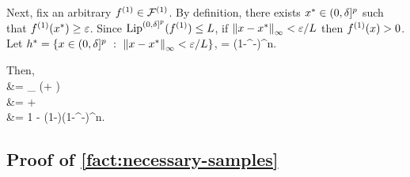Next, fix an arbitrary $f^{(1)}\in\mathcal{F}^{(1)}$. By definition, there exists $x^* \in (0,\delta]^p$ such that $f^{(1)}(x^*) \geq \varepsilon$. Since $\mathrm{Lip}^{(0,\delta]^p}(f^{(1)}) \leq L$, if $\norm{\covval-\covvalalt}_\infty < \outscale/\lipconst$ then $f^{(1)}(x) > 0$. Let $\cubealt = \{\covval\in(0,\inscale]^\covdim \setdelim \norm{\covval-\covvalalt}_\infty < \outscale/\lipconst\}$, 
\*[
    \sampcompevent\timeind{t} = \Big\{\covobs\timeind{t} \in \cubealt \Big\}, \quad\text{and}\quad
    \sampcompevent = \bigcup_{t\in[n]} \sampcompevent\timeind{t}.
\]
Further, let $\inoutratio = \lipconst \inscale / (2\outscale)$. 
By definition, since $\queryalgo\feat{\inscale}$ is independent of $\model\altind$,
\*[
    \PP\feat{\queryalgo\feat{\inscale}\timeind{1:n}}\Big[\comp{\sampcompevent} \Big]
    = (1-\inoutratio^{-\covdim})^n.
\]

Then,
\*[
    \sampsenssym\timeind{n}(\queryalgo\feat{\inscale}, \samphyptestoracle\feat{\covprob})
    &= \inf_{\model\in\modelspace\altind} \EE\Big[\samphyprv{\queryalgo\feat{\inscale}[\model]}{\samphyptestoracle\feat{\covprob}}{n}\Big] \\
    &= \inf_{\model\in\modelspace\altind}
    \Bigg(\EE{}\PP{}\Big[\sampcompevent\Big] + \EE{}\PP{}\Big[\comp{\sampcompevent}\Big] \Bigg) \\
    &= \PP{}\Big[\sampcompevent\Big] + \covprob \cdot \PP{}\Big[\comp{\sampcompevent}\Big] \\
    &= 1 - (1-\covprob)(1-\inoutratio^{-\covdim})^n.
%
\]
\manualendproof


\subsection{Proof of \cref{fact:necessary-samples}}
%
%

